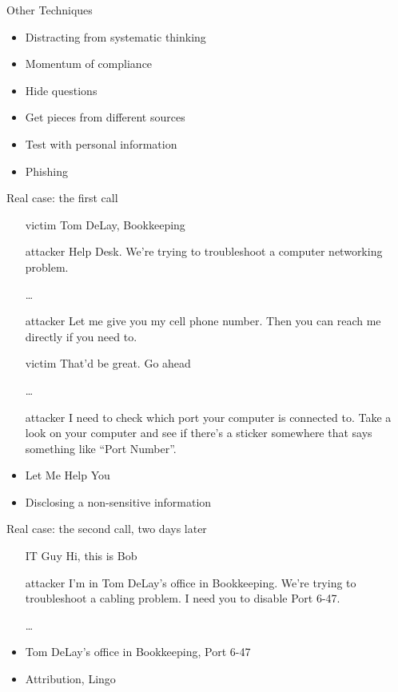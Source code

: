 \documentclass{beamer}
\begin{document}
\begin{frame}{Other Techniques}
  \begin{itemize}
    \item Distracting from systematic thinking
    \item Momentum of compliance
    \item Hide questions
    \item Get pieces from different sources
    \item Test with personal information
    \item Phishing
  \end{itemize}
\end{frame}

\begin{frame}{Real case: the first call}
  \begin{itemize}
    \item[victim] Tom DeLay, Bookkeeping
    \item[attacker] Help Desk.
      We're trying to troubleshoot a computer networking problem.
    \item[\dots]
    \item[attacker] Let me give you my cell phone number.
      Then you can reach me directly if you need to.
    \item[victim] That'd be great. Go ahead
    \item[\dots]
    \item[attacker] I need to check which port your computer is
      connected to. Take a look on your computer and see if there's a
      sticker somewhere that says something like ``Port Number''.
    \item Let Me Help You
    \item Disclosing a non-sensitive information
  \end{itemize}
\end{frame}

\begin{frame}{Real case: the second call, two days later}
  \begin{itemize}
    \item[IT Guy] Hi, this is Bob
    \item[attacker] I'm in Tom DeLay's office in
      Bookkeeping. We're trying to troubleshoot a cabling problem. I
      need you to disable Port 6-47.
    \item[\dots]
    \item Tom DeLay's office in Bookkeeping, Port 6-47
    \item Attribution, Lingo
  \end{itemize}
\end{frame}
\end{document}
